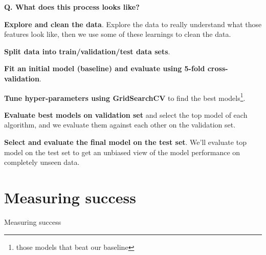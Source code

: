 \begin{frame}[fragile]{\textbf{Q. What does this process looks like?}}
  \begin{wideitemize}
    \item \textbf{Explore and clean the data}. Explore the data to really understand
    what those features look like, then we use some of these learnings to clean the data.
    \item \textbf{Split data into train/validation/test data sets}.
    \item \textbf{Fit an initial model (baseline) and evaluate using 5-fold cross-validation}.
    \item \textbf{Tune hyper-parameters using GridSearchCV} to find the best models\footnote{those models that beat our baseline}.
    \item \textbf{Evaluate best models on validation set} and select the top model of each
    algorithm, and we evaluate them against each other on the validation set.
    \item \textbf{Select and evaluate the final model on the test set}. We'll evaluate top
    model on the test set to get an unbiased view of the model performance on completely unseen data.
  \end{wideitemize}
\end{frame}

\section{Measuring success}
\begin{transitionframe}
  \begin{center}
    \Huge Measuring success
  \end{center}
\end{transitionframe}

